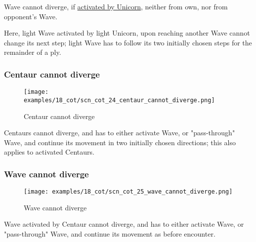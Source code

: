 \vspace*{-0.4\baselineskip}
Wave cannot diverge, if
\hyperref[fig:scn_mv_22_wave_activation_by_unicorn_first_step]{activated by Unicorn},
neither from own, nor from opponent's Wave.

Here, light Wave activated by light Unicorn, upon reaching another Wave cannot change
its next step; light Wave has to follow its two initially chosen steps for the remainder
of a ply.

\clearpage %

\subsubsection*{Centaur cannot diverge}
\label{sec:Conquest of Tlalocan/Shaman/Divergence/Centaur cannot diverge}

\vspace*{-1.2\baselineskip}
\noindent
\begin{figure}[!h]
\texttt{[image: examples/18\_cot/scn\_cot\_24\_centaur\_cannot\_diverge.png]}
\caption{Centaur cannot diverge}
\label{fig:scn_cot_24_centaur_cannot_diverge}
\end{figure}

Centaurs cannot diverge, and has to either activate Wave, or "pass-through" Wave,
and continue its movement in two initially chosen directions; this also applies
to activated Centaurs.

\clearpage %

\subsubsection*{Wave cannot diverge}
\label{sec:Conquest of Tlalocan/Shaman/Divergence/Wave cannot diverge/2}

\vspace*{-1.2\baselineskip}
\noindent
\begin{figure}[!h]
\texttt{[image: examples/18\_cot/scn\_cot\_25\_wave\_cannot\_diverge.png]}
\caption{Wave cannot diverge}
\label{fig:scn_cot_25_wave_cannot_diverge}
\end{figure}

Wave activated by Centaur cannot diverge, and has to either activate Wave,
or "pass-through" Wave, and continue its movement as before encounter.

